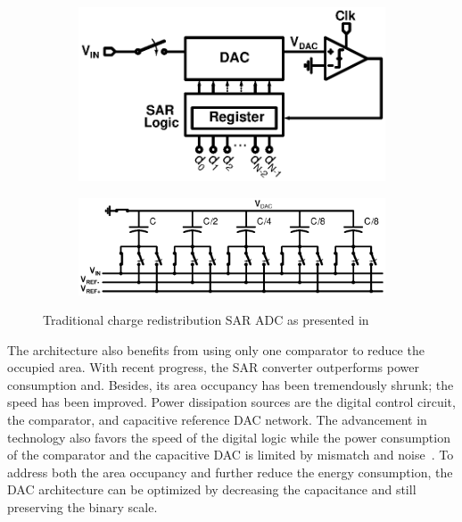 \begin{figure}[htp]
	\centering
	\begin{subfigure}[b]{0.44\textwidth}
		\includegraphics[width=\textwidth]{Chapter3/Figs/sar_principle.ps}
		\label{fig:sar_principle}
	\end{subfigure}
	\begin{subfigure}[b]{0.52\textwidth}
		\includegraphics[width=\textwidth]{Chapter3/Figs/sar_classic_dac.ps}
		\label{fig:sar_dac_classical}
	\end{subfigure}
	\caption{Traditional charge redistribution SAR ADC as presented in~\cite{McCreary1975}}
	\label{fig:sar_adc}
\end{figure}

The architecture also benefits from using only one comparator to reduce the occupied area. With recent progress, the SAR converter outperforms power consumption and. Besides, its area occupancy has been tremendously shrunk; the speed has been improved. Power dissipation sources are the digital control circuit, the comparator, and capacitive reference DAC network. The advancement in technology also favors the speed of the digital logic while the power consumption of the comparator and the capacitive DAC is limited by mismatch and noise~\cite{Yue2013,Mueller2013,Collins2017}. To address both the area occupancy and further reduce the energy consumption, the DAC architecture can be optimized by decreasing the capacitance and still preserving the binary scale.

